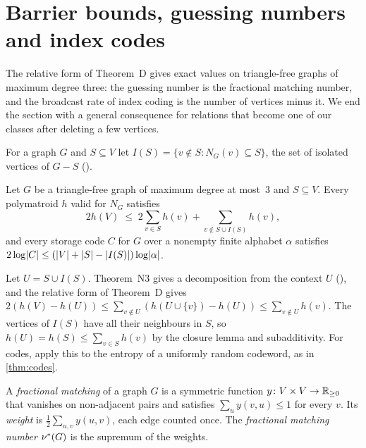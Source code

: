 \section{Barrier bounds, guessing numbers and index codes}\label{sec:consequences}

The relative form of Theorem~D gives exact values on triangle-free graphs of maximum degree three: the guessing number
is the fractional matching number, and the broadcast rate of index coding is the number of vertices minus it. We end the
section with a general consequence for relations that become one of our classes after deleting a few vertices.

For a graph $G$ and $S\subseteq V$ let $I(S)=\{v\notin S:N_G(v)\subseteq S\}$, the set of isolated vertices of $G-S$
().

\begin{theorem}\label{thm:barrier}
Let $G$ be a triangle-free graph of maximum degree at most~$3$ and $S\subseteq V$. Every polymatroid $h$ valid for $N_G$
satisfies
\[
  2h(V)\;\le\;2\sum_{v\in S}h(v)+\sum_{v\notin S\cup I(S)}h(v),
\]
and every storage code $C$ for $G$ over a nonempty finite alphabet $\alpha$ satisfies
$2\log\lvert C \rvert\le(\lvert V \rvert+\lvert S \rvert-\lvert I(S) \rvert)\log\lvert \alpha \rvert$.
\end{theorem}

\begin{outline}
Let $U=S\cup I(S)$. Theorem~N3 gives a decomposition from the context $U$ (), and the relative form of
Theorem~D gives $2(h(V)-h(U))\le\sum_{v\notin U}(h(U\cup\{v\})-h(U))\le\sum_{v\notin U}h(v)$. The vertices of $I(S)$
have all their neighbours in $S$, so $h(U)=h(S)\le\sum_{v\in S}h(v)$ by the closure lemma and subadditivity. For codes,
apply this to the entropy of a uniformly random codeword, as in \cref{thm:codes}.
\end{outline}

\begin{definition}\label{def:fracmatching}
A \emph{fractional matching} of a graph $G$ is a symmetric function $y\colon V\times V\to\mathbb{R}_{\ge0}$ that vanishes on
non-adjacent pairs and satisfies $\sum_uy(v,u)\le1$ for every $v$. Its \emph{weight} is $\frac12\sum_{u,v}y(u,v)$, each
edge counted once. The \emph{fractional matching number} $\nu^{*}(G)$ is the supremum of the weights.
\end{definition}

